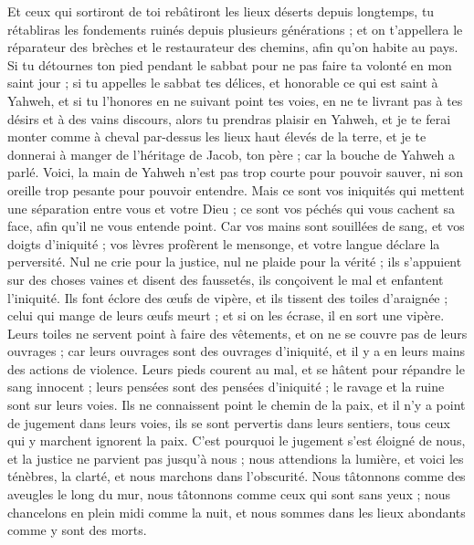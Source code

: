 \begin{multicols}{2}
Et ceux qui sortiront de toi rebâtiront les lieux déserts depuis longtemps, tu rétabliras les fondements ruinés depuis plusieurs générations ; et on t'appellera le réparateur des brèches et le restaurateur des chemins, afin qu'on habite au pays.
Si tu détournes ton pied pendant le sabbat pour ne pas faire ta volonté en mon saint jour ; si tu appelles le sabbat tes délices, et honorable ce qui est saint à Yahweh, et si tu l'honores en ne suivant point tes voies, en ne te livrant pas à tes désirs et à des vains discours,
alors tu prendras plaisir en Yahweh, et je te ferai monter comme à cheval par-dessus les lieux haut élevés de la terre, et je te donnerai à manger de l'héritage de Jacob, ton père ; car la bouche de Yahweh a parlé.
\VerseOne{}Voici, la main de Yahweh n'est pas trop courte pour pouvoir sauver, ni son oreille trop pesante pour pouvoir entendre.
Mais ce sont vos iniquités qui mettent une séparation entre vous et votre Dieu ; ce sont vos péchés qui vous cachent sa face, afin qu'il ne vous entende point.
Car vos mains sont souillées de sang, et vos doigts d'iniquité ; vos lèvres profèrent le mensonge, et votre langue déclare la perversité.
Nul ne crie pour la justice, nul ne plaide pour la vérité ; ils s'appuient sur des choses vaines et disent des faussetés, ils conçoivent le mal et enfantent l'iniquité.
Ils font éclore des œufs de vipère, et ils tissent des toiles d'araignée ; celui qui mange de leurs œufs meurt ; et si on les écrase, il en sort une vipère.
Leurs toiles ne servent point à faire des vêtements, et on ne se couvre pas de leurs ouvrages ; car leurs ouvrages sont des ouvrages d'iniquité, et il y a en leurs mains des actions de violence.
Leurs pieds courent au mal, et se hâtent pour répandre le sang innocent ; leurs pensées sont des pensées d'iniquité ; le ravage et la ruine sont sur leurs voies.
Ils ne connaissent point le chemin de la paix, et il n'y a point de jugement dans leurs voies, ils se sont pervertis dans leurs sentiers, tous ceux qui y marchent ignorent la paix.
C'est pourquoi le jugement s'est éloigné de nous, et la justice ne parvient pas jusqu'à nous ; nous attendions la lumière, et voici les ténèbres, la clarté, et nous marchons dans l'obscurité.
Nous tâtonnons comme des aveugles le long du mur, nous tâtonnons comme ceux qui sont sans yeux ; nous chancelons en plein midi comme la nuit, et nous sommes dans les lieux abondants comme y sont des morts.

\end{multicols}

